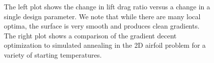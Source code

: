 \documentclass{article} %
\begin{document}
\begin{figure}[h]
\begin{center}
\end{center}
\label{boundary_space_explore}
\caption{The left plot shows the change in lift drag ratio versus a change in a single design parameter. We note that while there are many local optima, the surface is very smooth and produces clean gradients. The right plot shows a comparison of the gradient decent optimization to simulated annealing in the 2D airfoil problem for a variety of starting temperatures.}
\end{figure}
\end{document}
